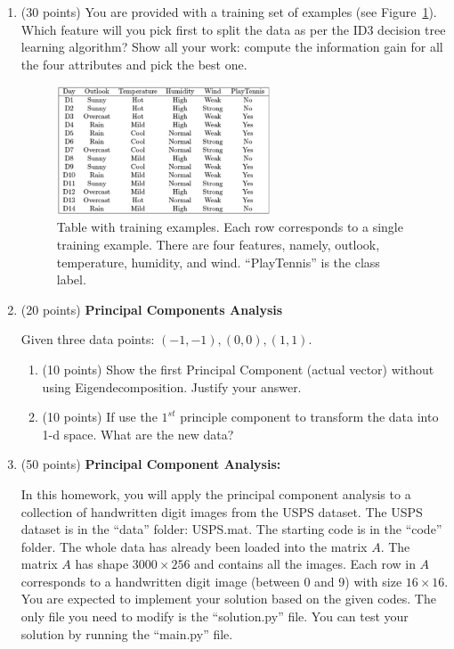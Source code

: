 \documentclass[11pt]{article}
\begin{document}
\begin{enumerate}

\item (30 points) You are provided with a training set of
examples (see Figure~\ref{fig:tree}). Which feature will you pick
first to split the data as per the ID3 decision tree learning
algorithm? Show all your work: compute the information gain for
all the four attributes and pick the best one.

\begin{figure}[ht]\label{fig:tree}
\begin{center}
    \includegraphics[width=0.6\textwidth]{FIG/tree.jpg}
    \caption{Table with training examples. Each row corresponds
    to a single training example. There are four features,
    namely, outlook, temperature, humidity, and wind.
    ``PlayTennis'' is the class label.}
\end{center}
\end{figure}

\item (20 points) \textbf{ Principal Components Analysis}
    
    Given three data points: $(-1, -1), (0,0), (1,1)$.

    \begin{enumerate}
        \item (10 points) Show the first Principal Component
        (actual vector) without using Eigendecomposition. Justify
        your answer.

        
        \item (10 points) If use the $1^{st}$ principle component
        to transform the data into 1-d space. What are the new
        data?


\end{enumerate}

\item (50 points) \textbf{Principal Component Analysis:}
    
    In this homework, you will apply the principal component
    analysis to a collection of handwritten digit images from the
    USPS dataset. The USPS dataset is in the ``data'' folder:
    USPS.mat. The starting code is in the ``code'' folder. The
    whole data has already been loaded into the matrix $A$. The
    matrix $A$ has shape $3000\times 256$ and contains all the
    images. Each row in $A$ corresponds to a handwritten digit
    image (between 0 and 9) with size $16\times 16$. You are
    expected to implement your solution based on the given codes.
    The only file you need to modify is the ``solution.py'' file.
    You can test your solution by running the ``main.py'' file.
    

\end{enumerate}
\end{document}
